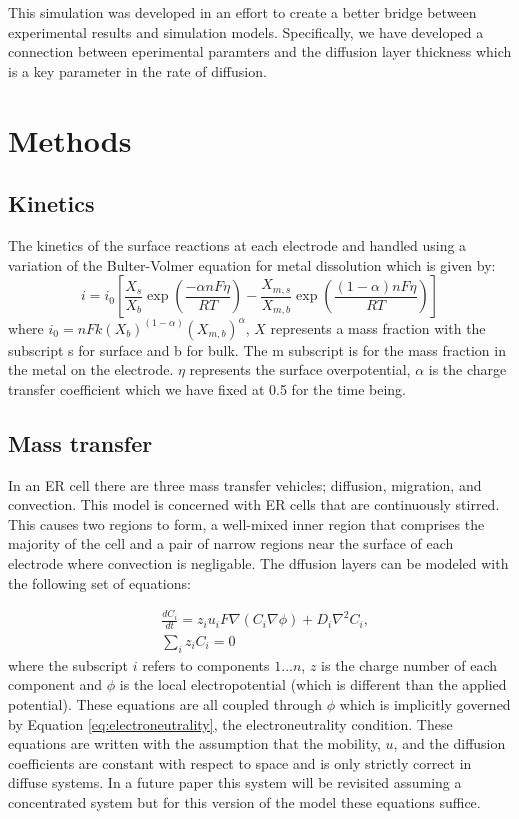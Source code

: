\documentclass[journal=mamobx]{achemso}
\begin{document}
This simulation was developed in an effort to create a better bridge between experimental results and simulation models. 
Specifically, we have developed a connection between eperimental paramters and the diffusion layer thickness which is a key parameter in the rate of diffusion.


\section{Methods}
\subsection{Kinetics}
The kinetics of the surface reactions at each electrode and handled using a variation of the Bulter-Volmer equation for metal dissolution which is given by:
\begin{equation}
  i = i_0\left [\frac{X_s}{X_b}\exp\left (\frac{-\alpha nF\eta}{RT}\right ) 
- \frac{X_{m,s}}{X_{m,b}}\exp\left (\frac{(1-\alpha)nF\eta}{RT}\right )\right ]
\end{equation}
where $i_0 = nFk(X_b)^{(1-\alpha)}(X_{m,b})^\alpha$, $X$ represents a mass fraction with the subscript s for surface and b for bulk.
The m subscript is for the mass fraction in the metal on the electrode. $\eta$ represents the surface overpotential, $\alpha$ is the charge transfer coefficient which we have fixed at 0.5 for the time being.  
\subsection{Mass transfer}
In an ER cell there are three mass transfer vehicles; diffusion, migration, and convection. 
This model is concerned with ER cells that are continuously stirred. 
This causes two regions to form, a well-mixed inner region that comprises the majority of the cell and a pair of narrow regions near the surface of each electrode where convection is negligable.
The dffusion layers can be modeled with the following set of equations:

\begin{align}
    & \frac{dC_i}{dt} = z_iu_iF\nabla (C_i\nabla \phi) + D_i \nabla^2C_i, \label{eq:migration_diffusion}\\ 
    & \sum_i z_i C_i = 0 \label{eq:electroneutrality}
\end{align}
where the subscript $i$ refers to components ${1...n}$, $z$ is the charge number of each component and $\phi$ is the local electropotential (which is different than the applied potential).
These equations are all coupled through $\phi$ which is implicitly governed by Equation \ref{eq:electroneutrality}, the electroneutrality condition.
These equations are written with the assumption that the mobility, $u$, and the diffusion coefficients are constant with respect to space and is only strictly correct in diffuse systems. 
In a future paper this system will be revisited assuming a concentrated system but for this version of the model these equations suffice.
\end{document}
